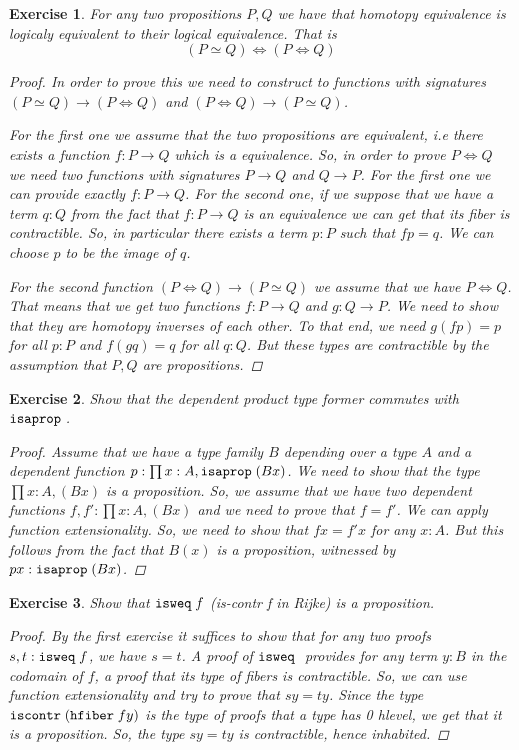 \documentclass[10pt]{article}
\newtheorem{exercise}{Exercise}
\begin{document}
\begin{exercise}
For any two propositions $P, Q$ we have that
homotopy equivalence is logicaly equivalent to their
logical equivalence. That is
\[
 (P \simeq Q) \iff (P \iff Q)
\]
\begin{proof}
In order to prove this we need to construct to
functions with signatures $(P \simeq Q) \to (P \iff Q)$
and $(P \iff Q) \to (P \simeq Q)$.

For the first
one we assume that the two propositions
are equivalent, i.e there exists a function
$f : P \to Q$ which is a equivalence. So, in
order to prove $P \iff Q$ we need two functions
with signatures $P \to Q$ and $Q \to P$. For
the first one we can provide exactly
$f : P \to Q$. For the second one, if we suppose
that we have a term $q : Q$ from the fact that
$f : P \to Q$ is an equivalence we can get that
its fiber is contractible. So, in particular
there exists a term $p : P$ such that $f p = q$.
We can choose $p$ to be the image of $q$.

For the second function $(P \iff Q) \to (P \simeq Q)$
we assume that we have $P \iff Q$. That means
that we get two functions $f : P \to Q$ and
$g : Q \to P$. We need to show that they are
homotopy inverses of each other. To that end, we
need $g (f p) = p$ for all $p : P$ and $f (g q) = q$
for all $q : Q$. But these types are contractible
by the assumption that $P, Q$ are propositions.
\end{proof}
\end{exercise}

\begin{exercise}
Show that the dependent product type former
commutes with $\mathtt{isaprop \;}$.
\begin{proof}
Assume that we have a type family $B$ depending
over a type $A$ and a dependent function
$p: \prod x : A, \mathtt{isaprop \;} (B x)$. We need to show
that the type $\prod x : A, (B x)$ is a proposition.
So, we assume that we have two dependent functions
$f, f' : \prod x : A, (B x)$ and we need to prove
that $f = f'$. We can apply function extensionality.
So, we need to show that $f x = f' x$ for any $x : A$.
But this follows from the fact that $B (x)$ is
a proposition, witnessed by $p x : \mathtt{isaprop \;} (B x)$.
\end{proof}
\end{exercise}

\begin{exercise}
Show that $\mathtt{isweq \;} f$ (is-contr f in Rijke) is a
proposition.
\begin{proof}
By the first exercise it suffices to show
that for any two proofs $s, t : \mathtt{isweq \;} f$,
we have $s = t$. A proof of $\mathtt{isweq \;}$
provides for any term $y : B$ in the codomain
of $f$, a proof that its type of
fibers is contractible. So, we can use
function extensionality and try to prove
that $s y = t y$. Since the type
$\mathtt{iscontr \;} (\mathtt{hfiber \;} f y)$ is the type of proofs
that a type has 0 hlevel, we get that it is a
proposition. So, the type $s y = t y$ is
contractible, hence inhabited.
\end{proof}
\end{exercise}
\end{document}
